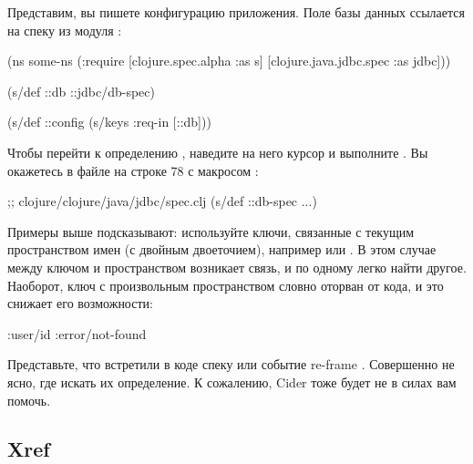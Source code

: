 Представим, вы пишете конфигурацию приложения. Поле  базы данных ссылается на спеку из модуля :

\begin{english}
  \begin{clojure}
(ns some-ns
  (:require
   [clojure.spec.alpha :as s]
   [clojure.java.jdbc.spec :as jdbc]))

(s/def ::db ::jdbc/db-spec)

(s/def ::config
  (s/keys :req-in [::db]))
  \end{clojure}
\end{english}

Чтобы перейти к определению , наведите на него курсор и выполните . Вы окажетесь в файле  на строке 78 с макросом :

\begin{english}
  \begin{clojure}
;; clojure/clojure/java/jdbc/spec.clj
(s/def ::db-spec ...)
  \end{clojure}
\end{english}

Примеры выше подсказывают: используйте ключи, связанные с текущим пространством имен (с двойным двоеточием), например  или . В этом случае между ключом и пространством возникает связь, и по одному легко найти другое. Наоборот, ключ с произвольным пространством словно оторван от кода, и это снижает его возможности:

\begin{english}
  \begin{clojure}
:user/id
:error/not-found
  \end{clojure}
\end{english}

Представьте, что встретили в коде спеку  или событие re-frame . Совершенно не ясно, где искать их определение. К сожалению, Cider тоже будет не в силах вам помочь.

\subsection{Xref}

\label{section-xref}

\def\urlfastautocomp{https://pypi.org/project/fast-autocomplete/}

\def\urlctags{https://en.wikipedia.org/wiki/Ctags}

